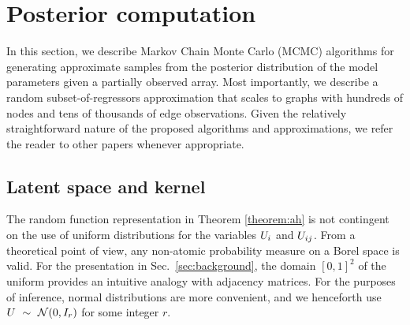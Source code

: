 



\section{Posterior computation}
\label{sec:Inference}

In this section, we describe Markov Chain Monte Carlo (MCMC) algorithms for generating approximate samples from the posterior distribution of the model parameters given a partially observed array.  Most importantly, we describe a random subset-of-regressors approximation that scales to graphs with hundreds of nodes and tens of thousands of edge observations. Given the relatively straightforward nature of the proposed algorithms and approximations, we refer the reader to other papers whenever appropriate.

\subsection{Latent space and kernel}

The random function representation in Theorem \ref{theorem:ah} is not contingent on the use of uniform distributions 
for the variables $U_i$ and $U_{ij}$. From a theoretical point of view, any non-atomic
probability measure on a Borel space is valid. For the presentation in Sec.~\ref{sec:background}, 
the domain $[0,1]^2$ of the uniform provides an intuitive analogy
with adjacency matrices. For the purposes of inference, normal distributions are more convenient, and we henceforth use
${U \ \sim\  \mathcal{N}(0, I_r)}$ for some integer $r$.

